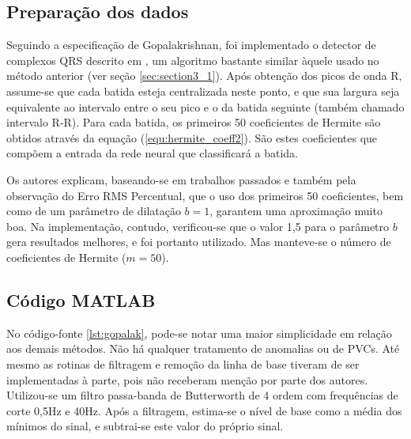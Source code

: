 \subsection{Preparação dos dados}
Seguindo a especificação de Gopalakrishnan, foi implementado o detector de complexos QRS descrito em \cite{Tompkins85}, um algoritmo bastante similar àquele usado no método anterior (ver seção \ref{sec:section3_1}). Após obtenção dos picos de onda R, assume-se que cada batida esteja centralizada neste ponto, e que sua largura seja equivalente ao intervalo entre o seu pico e o da batida seguinte (também chamado intervalo R-R). Para cada batida, os primeiros 50 coeficientes de Hermite são obtidos através da equação (\ref{equ:hermite_coeff2}). São estes coeficientes que compõem a entrada da rede neural que classificará a batida.

Os autores explicam, baseando-se em trabalhos passados e também pela observação do Erro RMS Percentual, que o uso dos primeiros 50 coeficientes, bem como de um parâmetro de dilatação $b=1$, garantem uma aproximação muito boa. Na implementação, contudo, verificou-se que o valor 1,5 para o parâmetro $b$ gera resultados melhores, e foi portanto utilizado. Mas  manteve-se o número de coeficientes de Hermite ($m=50$).

\subsection{Código MATLAB}
No código-fonte \ref{lst:gopalak}, pode-se notar uma maior simplicidade em relação aos demais métodos. Não há qualquer tratamento de anomalias ou de PVCs. Até mesmo as rotinas de filtragem e remoção da linha de base tiveram de ser implementadas à parte, pois não receberam menção por parte dos autores. Utilizou-se um filtro passa-banda de Butterworth de 4\textordfeminine{} ordem com frequências de corte 0,5Hz e 40Hz. Após a filtragem, estima-se o nível de base como a média dos mínimos do sinal, e subtrai-se este valor do próprio sinal.


